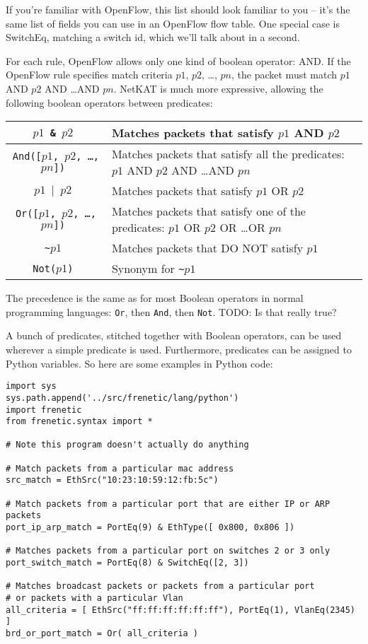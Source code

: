 \bigskip
If you're familiar with OpenFlow, this list should look familiar to you -- it's the same list of fields you can 
use in an OpenFlow flow table.
One special case is SwitchEq, matching a switch id, which we'll talk about in a second.  

For each rule, OpenFlow allows only one kind of boolean operator: AND.  
If the OpenFlow rule specifies match criteria $p1$, $p2$, \ldots, $pn$, the packet must match $p1$ AND $p2$
AND \ldots AND $pn$.  
NetKAT is much more expressive, allowing the following boolean operators between predicates:

\bigskip
\begin{tabularx}{6in}{|c|X|}
\hline\hline
\tt{$p1$ \& $p2$} & Matches packets that satisfy $p1$ AND $p2$
\\ \hline  
\tt{And([$p1$, $p2$, \ldots, $pn$])} & 
Matches packets that satisfy all the predicates: $p1$ AND $p2$ AND \ldots AND $pn$
\\ \hline  
\tt{$p1$ $\vert$ $p2$} & Matches packets that satisfy $p1$ OR $p2$
\\ \hline  
\tt{Or([$p1$, $p2$, \ldots, $pn$])} & 
Matches packets that satisfy one of the predicates: $p1$ OR $p2$ OR \ldots OR $pn$
\\ \hline  
\tt{\textasciitilde $p1$} & Matches packets that DO NOT satisfy $p1$
\\ \hline  
\tt{Not($p1$)} & Synonym for \tt{\textasciitilde $p1$}
\\ \hline\hline
\end{tabularx}

\bigskip

The precedence is the same as for most Boolean operators in normal programming languages: 
\lstinline{Or}, then \lstinline{And}, then \lstinline{Not}.  
TODO: Is that really true?

A bunch of predicates, stitched together with Boolean operators, can be used wherever a simple predicate is used.
Furthermore, predicates can be assigned to Python variables.
So here are some examples in Python code:

\begin{lstlisting}
import sys
sys.path.append('../src/frenetic/lang/python')
import frenetic
from frenetic.syntax import *

# Note this program doesn't actually do anything

# Match packets from a particular mac address
src_match = EthSrc("10:23:10:59:12:fb:5c")

# Match packets from a particular port that are either IP or ARP packets
port_ip_arp_match = PortEq(9) & EthType([ 0x800, 0x806 ])

# Matches packets from a particular port on switches 2 or 3 only
port_switch_match = PortEq(8) & SwitchEq([2, 3])

# Matches broadcast packets or packets from a particular port 
# or packets with a particular Vlan
all_criteria = [ EthSrc("ff:ff:ff:ff:ff:ff"), PortEq(1), VlanEq(2345) ] 
brd_or_port_match = Or( all_criteria ) 

\end{lstlisting}

